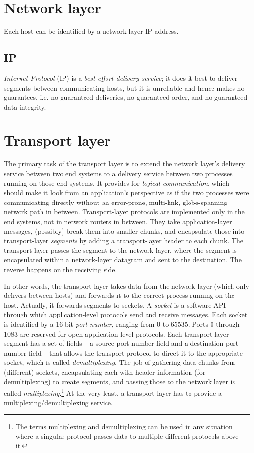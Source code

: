 \documentclass[table, xcdraw]{article}%
\begin{document}
\section{Network layer} \label{ch:network}

Each host can be identified by a network-layer IP address.

\subsection{IP}

\emph{Internet Protocol} (IP) is a \emph{best-effort delivery service}; it does it best to deliver segments between communicating hosts, but it is unreliable and hence makes no guarantees, i.e. no guaranteed deliveries, no guaranteed order, and no guaranteed data integrity.

\section{Transport layer} \label{ch:transport}

The primary task of the transport layer is to extend the network layer's delivery service between two end systems to a delivery service between two processes running on those end systems. It provides for \emph{logical communication}, which should make it look from an application’s perspective as if the two processes were communicating directly without an error-prone, multi-link, globe-spanning network path in between. Transport-layer protocols are implemented only in the end
systems, not in network routers in between. They take application-layer messages, (possibly) break them into smaller chunks, and encapsulate those into transport-layer \emph{segments} by adding a transport-layer header to each chunk. The transport layer passes the segment to the network layer, where the segment is encapsulated within a network-layer datagram and sent to the destination. The reverse happens on the receiving side.

In other words, the transport layer takes data from the network layer (which only delivers between hosts) and forwards it to the correct process running on the host. Actually, it forwards segments to sockets. A \emph{socket} is a software API through which application-level protocols send and receive messages. Each socket is identified by a 16-bit \emph{port number}, ranging from 0 to 65535. Ports 0 through 1083 are reserved for open application-level protocols. Each transport-layer segment has a set of fields -- a source port number field and a destination port number field -- that allows the transport protocol to direct it to the appropriate socket, which is called \emph{demultiplexing}. The job of gathering data chunks from (different) sockets, encapsulating each with header information (for demultiplexing) to create segments, and passing those to the network layer is called \emph{multiplexing}.\footnote{The terms multiplexing and demultiplexing can be used in any situation where a singular protocol passes data to multiple different protocols above it.} At the very least, a transport layer has to provide a multiplexing/demultiplexing service.
\end{document}
